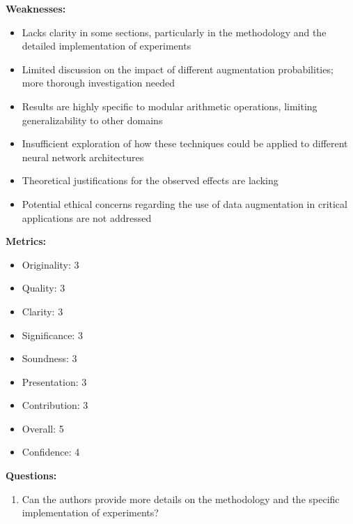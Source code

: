 \begin{tcolorbox}[colback=white!5!white, colframe=black!75!black ]
    
\textbf{Weaknesses:}
\begin{itemize}
\item Lacks clarity in some sections, particularly in the methodology and the detailed implementation of experiments




        \item Limited discussion on the impact of different augmentation probabilities; more thorough investigation needed
        \item Results are highly specific to modular arithmetic operations, limiting generalizability to other domains
        \item Insufficient exploration of how these techniques could be applied to different neural network architectures
        \item Theoretical justifications for the observed effects are lacking
        \item Potential ethical concerns regarding the use of data augmentation in critical applications are not addressed
    \end{itemize}

\textbf{Metrics:}
\begin{itemize}
    \item Originality: 3
    \item Quality: 3
    \item Clarity: 3
    \item Significance: 3
    \item Soundness: 3
    \item Presentation: 3
    \item Contribution: 3
    \item Overall: 5
    \item Confidence: 4
\end{itemize}

\textbf{Questions:}
\begin{enumerate}
    \item Can the authors provide more details on the methodology and the specific implementation of experiments?
    
\end{enumerate}

\end{tcolorbox}

